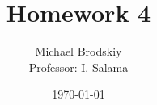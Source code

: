 


\title{Homework 4}
\date{\today}
\author{Michael Brodskiy\\ \small Professor: I. Salama}



\maketitle

